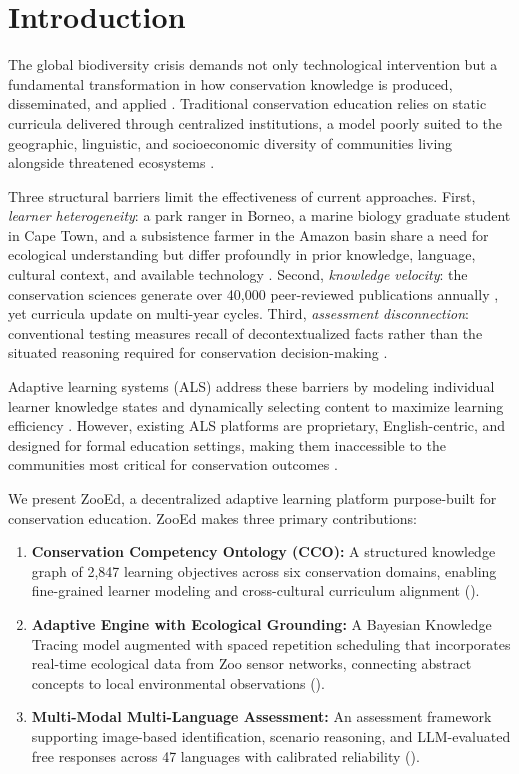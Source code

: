 \section{Introduction}

\label{sec:introduction}

The global biodiversity crisis demands not only technological intervention but a fundamental transformation in how conservation knowledge is produced, disseminated, and applied \citep{diaz2019global}.
Traditional conservation education relies on static curricula delivered through centralized institutions, a model poorly suited to the geographic, linguistic, and socioeconomic diversity of communities living alongside threatened ecosystems \citep{brewer2020conservation}.

Three structural barriers limit the effectiveness of current approaches.
First, \emph{learner heterogeneity}: a park ranger in Borneo, a marine biology graduate student in Cape Town, and a subsistence farmer in the Amazon basin share a need for ecological understanding but differ profoundly in prior knowledge, language, cultural context, and available technology \citep{ardoin2020environmental}.
Second, \emph{knowledge velocity}: the conservation sciences generate over 40,000 peer-reviewed publications annually \citep{fisher2022growth}, yet curricula update on multi-year cycles.
Third, \emph{assessment disconnection}: conventional testing measures recall of decontextualized facts rather than the situated reasoning required for conservation decision-making \citep{stern2014value}.

Adaptive learning systems (ALS) address these barriers by modeling individual learner knowledge states and dynamically selecting content to maximize learning efficiency \citep{vanlehn2011relative}.
However, existing ALS platforms are proprietary, English-centric, and designed for formal education settings, making them inaccessible to the communities most critical for conservation outcomes \citep{kulik2016effectiveness}.

We present ZooEd, a decentralized adaptive learning platform purpose-built for conservation education.
ZooEd makes three primary contributions:

\begin{enumerate}[leftmargin=*]
    \item \textbf{Conservation Competency Ontology (CCO):} A structured knowledge graph of 2,847 learning objectives across six conservation domains, enabling fine-grained learner modeling and cross-cultural curriculum alignment ().
    \item \textbf{Adaptive Engine with Ecological Grounding:} A Bayesian Knowledge Tracing model augmented with spaced repetition scheduling that incorporates real-time ecological data from Zoo sensor networks, connecting abstract concepts to local environmental observations ().
    \item \textbf{Multi-Modal Multi-Language Assessment:} An assessment framework supporting image-based identification, scenario reasoning, and LLM-evaluated free responses across 47 languages with calibrated reliability ().
\end{enumerate}

